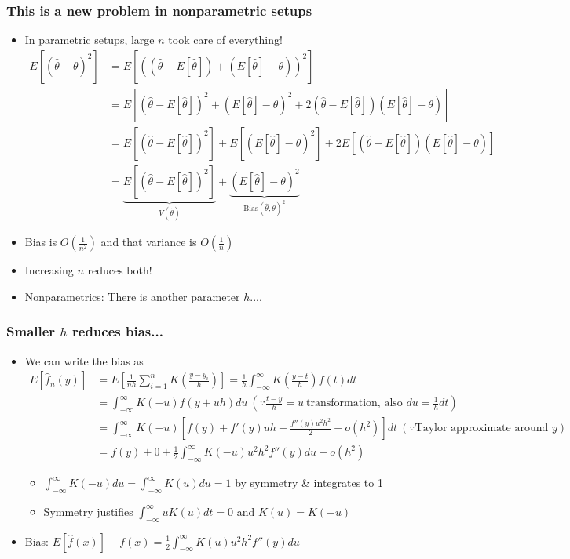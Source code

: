 \documentclass[aspectratio=169]{beamer}
\begin{document}
\begin{frame}
\frametitle{This is a new problem in nonparametric setups}
\begin{itemize}
\item In parametric setups, large $n$ took care of everything!
\[
\begin{aligned}
E[(\hat{\theta}-\theta)^2]&=E[((\hat{\theta}-E[\hat{\theta}])+(E[\hat{\theta}]-\theta))^2]\\
&=E[(\hat{\theta}-E[\hat{\theta}])^2+(E[\hat{\theta}]-\theta)^2+2(\hat{\theta}-E[\hat{\theta}])(E[\hat{\theta}]-\theta)]\\
&=E[(\hat{\theta}-E[\hat{\theta}])^2]+E[(E[\hat{\theta}]-\theta)^2]+2E[(\hat{\theta}-E[\hat{\theta}])(E[\hat{\theta}]-\theta)]\\
&=\underbrace{E[(\hat{\theta}-E[\hat{\theta}])^2]}_{V(\hat{\theta})}+\underbrace{(E[\hat{\theta}]-\theta)^2}_{\text{Bias}(\hat{\theta},\theta)^2}
\end{aligned}
\]
\item Bias is $O\left(\frac{1}{n^2}\right)$ and that variance is $O\left(\frac{1}{n}\right)$
\item Increasing $n$ reduces both!
\item Nonparametrics: There is another parameter $h$....
\end{itemize}
\end{frame}

\begin{frame}
\frametitle{Smaller $h$ reduces bias... }
\begin{itemize}
\item We can write the bias as 
\footnotesize{\begin{align*}
E[\hat{f}_n(y)]&=E\left[\frac{1}{nh}\sum_{i=1}^n K\left(\frac{y-y_i}{h}\right)\right]=\frac{1}{h}\int_{-\infty}^\infty K\left(\frac{y-t}{h}\right)f(t)dt\\
&=\int_{-\infty}^\infty K(-u)f(y+uh)du \ \left(\because \frac{t-y}{h}=u \ \text{transformation, also } du=\frac{1}{h}dt\right)\\
&=\int_{-\infty}^\infty K(-u)\left[f(y)+f'(y)uh + \frac{f''(y)u^2h^2}{2}+o(h^2)\right]dt \ (\because \text{Taylor approximate around $y$}) \\
&=f(y)+0+\frac{1}{2}\int_{-\infty}^\infty K(-u)u^2h^2f''(y)du + o(h^2)
\end{align*}}\normalsize
\begin{itemize}
\item $\int_{-\infty}^\infty K(-u)du=\int_{-\infty}^\infty K(u)du=1$ by symmetry \& integrates to 1
\item Symmetry justifies $\int_{-\infty}^\infty uK(u)dt=0$ and $K(u)=K(-u)$
\end{itemize}
\item Bias: $E[\hat{f}(x)]-f(x)=\frac{1}{2}\int_{-\infty}^\infty K(u)u^2h^2f''(y)du$
\end{itemize}
\end{frame}
\end{document}

